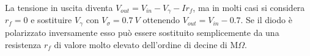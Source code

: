 La tensione in uscita diventa $V_{out}=V_{in}-V_{\gamma}-Ir_f$, ma in molti casi si considera $r_f=0$ e sostituire $V_\gamma$ con $V_{\sigma}=\SI{0.7}{V}$ ottenendo $V_{out}=V_{in}-0.7$. Se il diodo è polarizzato inversamente esso può essere sostituito semplicemente da una resistenza $r_f$ di valore molto elevato dell'ordine di decine di M$\Omega$.